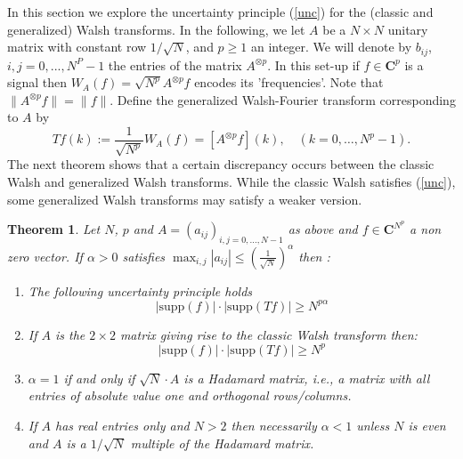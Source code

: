 \documentclass[11pt]{amsart}
\newtheorem{theorem}{Theorem}[section]
\theoremstyle{definition}
\theoremstyle{remark}
\numberwithin{equation}{section}
\begin{document}
\par In this section we explore the uncertainty principle (\ref{unc}) for the (classic and generalized) Walsh transforms.
 In the following, we let $A$ be a $N\times N$ unitary matrix with constant row $1/\sqrt{N}$, and $p\geq 1$ an integer. We will denote by $b_{ij}$, $i,j=0,..., N^P-1$  the entries of the matrix $A^{\otimes p}$. In this set-up if $f\in\mathbf{C}^p$ is a signal then $W_A(f)=\sqrt{N^p}A^{\otimes p}f$  encodes its 'frequencies'. Note that $\|A^{\otimes p}f\|=\|f\|$.  Define the generalized Walsh-Fourier transform corresponding to $A$ by
$$Tf(k):=\frac{1}{\sqrt{N^p}}W_A(f) =[ A^{\otimes p}f ](k),\quad(k=0,\dots, N^p-1).$$
The next theorem shows that a certain discrepancy occurs between the classic Walsh and generalized Walsh transforms. While the classic Walsh satisfies (\ref{unc}),  some generalized Walsh transforms may satisfy a weaker version.
\begin{theorem}\label{unw} Let $ N$, $p$ and $A=(a_{ij})_{i,j=0,\dots,N-1}$ as above and $f\in\mathbf{C}^{N^p}$ a non zero vector. If  $\alpha>0$ satisfies  $\max_{i,j}|a_{ij}|\leq (\frac{1}{\sqrt{N}})^{\alpha}$
then :
\begin{enumerate}
	\item The following uncertainty principle holds
	\begin{equation}\label{uncw}
|\text{supp}(f)|\cdot |\text{supp}(Tf)|\geq N^{p\alpha}
\end{equation}
\item If $A$ is the $2\times 2$ matrix giving rise to the classic Walsh transform then:
\begin{equation}\label{uncc}
|\text{supp}(f)|\cdot |\text{supp}(Tf)|\geq N^{p}
\end{equation}
\item
$\alpha=1$ if and only if $\sqrt{N}\cdot A$ is a Hadamard matrix, i.e., a matrix with all entries of absolute value one and orthogonal rows/columns.
\item If $A$ has real entries only and $N>2$ then necessarily $\alpha < 1$ unless $N$ is even and  $A$ is a $1/\sqrt{N}$ multiple of the Hadamard matrix.
\end{enumerate}
\end{theorem}
\end{document}
